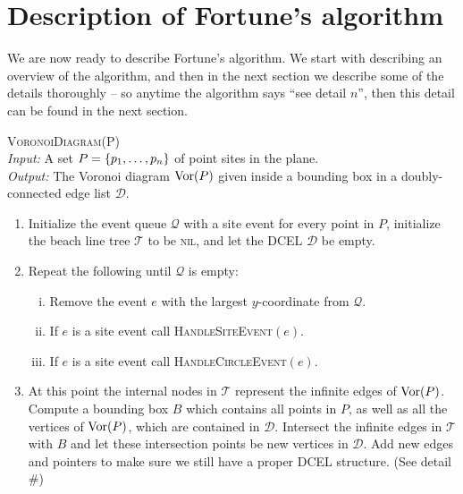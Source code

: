 \chapter{Description of Fortune's algorithm}

We are now ready to describe Fortune's algorithm. We start with describing an overview of the algorithm, and then in the next section we describe some of the details thoroughly -- so anytime the algorithm says ``see detail $n$'', then this detail can be found in the next section.

\begin{alg} \label{alg:fortune} \textsc{VoronoiDiagram}(P) \\
\textit{Input:} A set $P = \{p_1, \ldots, p_n\}$ of point sites in the plane. \\
\textit{Output:} The Voronoi diagram $\operatorname{Vor}(P)$ given inside a bounding box in a doubly-connected edge list $\mathcal{D}$.
\begin{enumerate}
    \item Initialize the event queue $\mathcal{Q}$ with a site event for every point in $P$, initialize the beach line tree $\mathcal{T}$ to be \textsc{nil}, and let the DCEL $\mathcal{D}$ be empty.
    \item Repeat the following until $\mathcal{Q}$ is empty:
    \begin{enumerate}[i.]
        \item Remove the event $e$ with the largest $y$-coordinate from $\mathcal{Q}$.
        \item If $e$ is a site event call \textsc{HandleSiteEvent}$(e)$.
        \item If $e$ is a site event call \textsc{HandleCircleEvent}$(e)$.
    \end{enumerate}
    \item At this point the internal nodes in $\mathcal{T}$ represent the infinite edges of $\operatorname{Vor}(P)$. Compute a bounding box $B$ which contains all points in $P$, as well as all the vertices of $\operatorname{Vor}(P)$, which are contained in $\mathcal{D}$. Intersect the infinite edges in $\mathcal{T}$ with $B$ and let these intersection points be new vertices in $\mathcal{D}$. Add new edges and pointers to make sure we still have a proper DCEL structure. (See detail \#)
\end{enumerate}
\end{alg}


